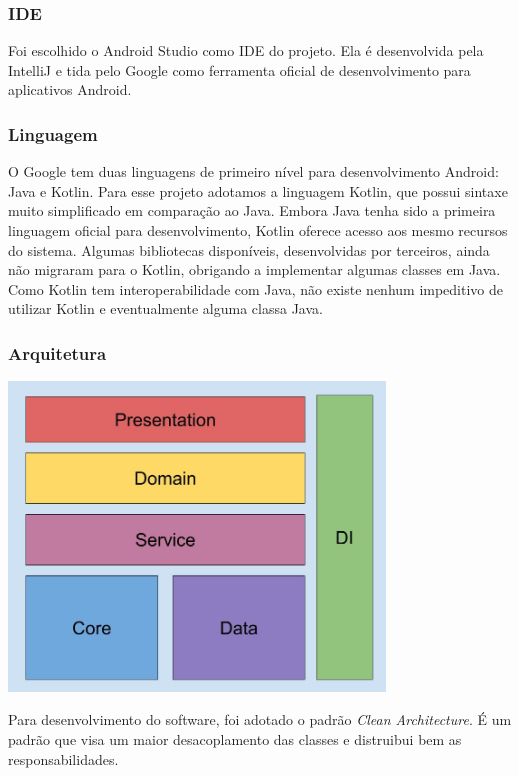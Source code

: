 \documentclass[
	12pt,				%
	oneside,			%
	a4paper,			%
	brazil				%
]{abntex2}
\begin{document}
\subsubsection{IDE}

Foi escolhido o Android Studio como IDE do projeto. Ela é desenvolvida pela IntelliJ e tida pelo Google como ferramenta oficial de desenvolvimento para aplicativos Android.

\subsubsection{Linguagem}

O Google tem duas linguagens de primeiro nível para desenvolvimento Android: Java e Kotlin. Para esse projeto adotamos a linguagem Kotlin, que possui sintaxe muito simplificado em comparação ao Java. Embora Java tenha sido a primeira linguagem oficial para desenvolvimento, Kotlin oferece acesso aos mesmo recursos do sistema.
Algumas bibliotecas disponíveis, desenvolvidas por terceiros, ainda não migraram para o Kotlin, obrigando a implementar algumas classes em Java. Como Kotlin tem interoperabilidade com Java, não existe nenhum impeditivo de utilizar Kotlin e eventualmente alguma classa Java.

\subsubsection{Arquitetura}

\includegraphics[width=10cm, center]{images/brick_diagram_beacon}

Para desenvolvimento do software, foi adotado o padrão \textit{Clean Architecture}. É um padrão que visa um maior desacoplamento das classes e distruibui bem as responsabilidades.
\end{document}
